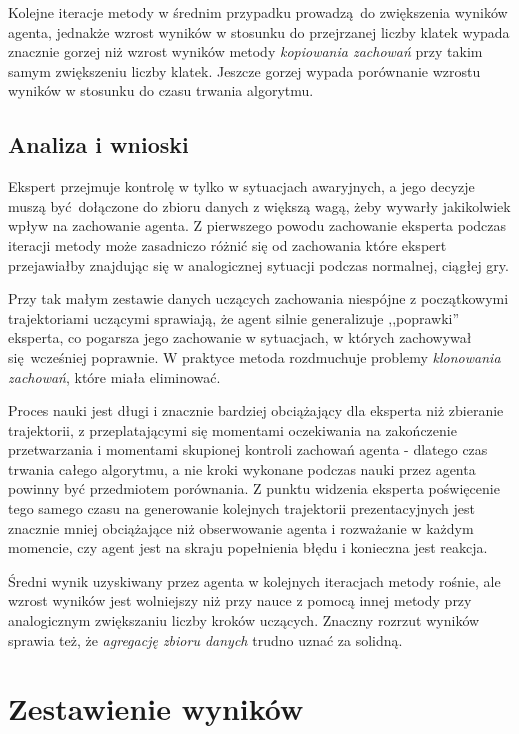 \documentclass[polish,master,a4paper,oneside]{ppfcmthesis}
\begin{document}
Kolejne iteracje metody w średnim przypadku prowadzą do zwiększenia wyników agenta, jednakże wzrost wyników w stosunku do przejrzanej liczby klatek wypada znacznie gorzej niż wzrost wyników metody \textit{kopiowania zachowań} przy takim samym zwiększeniu liczby klatek. Jeszcze gorzej wypada porównanie wzrostu wyników w stosunku do czasu trwania algorytmu. 

\subsection {Analiza i wnioski}

Ekspert przejmuje kontrolę w tylko w sytuacjach awaryjnych, a jego decyzje muszą być dołączone do zbioru danych z większą wagą, żeby wywarły jakikolwiek wpływ na zachowanie agenta. Z pierwszego powodu zachowanie eksperta podczas iteracji metody może zasadniczo różnić się od zachowania które ekspert przejawiałby znajdując się w analogicznej sytuacji podczas normalnej, ciągłej gry.

Przy tak małym zestawie danych uczących zachowania niespójne z początkowymi trajektoriami uczącymi sprawiają, że agent silnie generalizuje ,,poprawki'' eksperta, co pogarsza jego zachowanie w sytuacjach, w których zachowywał się wcześniej poprawnie. W praktyce metoda rozdmuchuje problemy \textit{ klonowania zachowań}, które miała eliminować.

Proces nauki jest długi i znacznie bardziej obciążający dla eksperta niż zbieranie trajektorii, z przeplatającymi się momentami oczekiwania na zakończenie przetwarzania i momentami skupionej kontroli zachowań agenta - dlatego czas trwania całego algorytmu, a nie kroki wykonane podczas nauki przez agenta powinny być przedmiotem porównania. Z punktu widzenia eksperta poświęcenie tego samego czasu na generowanie kolejnych trajektorii prezentacyjnych jest znacznie mniej obciążające niż obserwowanie agenta i rozważanie w każdym momencie, czy agent jest na skraju popełnienia błędu i konieczna jest reakcja.

Średni wynik uzyskiwany przez agenta w kolejnych iteracjach metody rośnie, ale wzrost wyników jest wolniejszy niż przy nauce z pomocą innej metody przy analogicznym zwiększaniu liczby kroków uczących. Znaczny rozrzut wyników sprawia też, że \textit{agregację zbioru danych} trudno uznać za solidną.
 \section{Zestawienie wyników}
\end{document}
